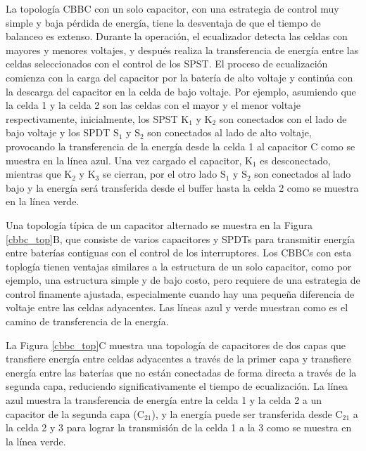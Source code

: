 \documentclass[10pt,a4paper]{article}
\begin{document}
La topolog\'ia \acrshort{CBBC} con un solo capacitor, con una estrategia de
control muy simple y baja p\'erdida de energ\'ia, tiene la desventaja de que el
tiempo de balanceo es extenso. Durante la operaci\'on, el ecualizador detecta
las celdas con mayores y menores voltajes, y despu\'es realiza la transferencia
de energ\'ia entre las celdas seleccionados con el control de los
\acrshort{SPST}. El proceso de ecualizaci\'on comienza con la carga del
capacitor por la bater\'ia de alto voltaje y contin\'ua con la descarga del
capacitor en la celda de bajo voltaje. Por ejemplo, asumiendo que la celda 1 y
la celda 2 son las celdas con el mayor y el menor voltaje respectivamente,
inicialmente, los \acrshort{SPST} $\mathrm{K_1}$ y $\mathrm{K_2}$ son conectados
con el lado de bajo voltaje y los \acrshort{SPDT} $\mathrm{S_1}$ y 
$\mathrm{S_2}$ son conectados al lado de alto voltaje, provocando la
transferencia de la energ\'ia desde la celda 1 al capacitor C como se muestra en
la línea azul. Una vez cargado el capacitor, $\mathrm{K_1}$ es desconectado,
mientras que $\mathrm{K_2}$ y $\mathrm{K_3}$ se cierran, por el otro lado
$\mathrm{S_1}$ y $\mathrm{S_2}$ son conectados al lado bajo y la energ\'ia
ser\'a transferida desde el buffer hasta la celda 2 como se muestra en la línea
verde.

Una topolog\'ia t\'ipica de un capacitor alternado se muestra en la Figura
\ref{cbbc_top}B, que consiste de varios capacitores y \acrshort{SPDT}s para
transmitir energ\'ia entre bater\'ias contiguas con el control de los
interruptores. Los \acrshort{CBBC}s con esta toplog\'ia tienen ventajas 
similares a la estructura de un solo capacitor, como por ejemplo, una estructura 
simple y de bajo costo, pero requiere de una estrategia de control finamente 
ajustada, especialmente cuando hay una pequeña diferencia de voltaje entre las 
celdas adyacentes. Las líneas azul y verde muestran como es el camino de 
transferencia de la energ\'ia.

La Figura \ref{cbbc_top}C muestra una topolog\'ia de capacitores de dos capas
que transfiere energ\'ia entre celdas adyacentes a trav\'es de la primer capa y
transfiere energ\'ia entre las bater\'ias que no est\'an conectadas de forma
directa a trav\'es de la segunda capa, reduciendo significativamente el tiempo
de ecualizaci\'on. La línea azul muestra la transferencia de energ\'ia entre la
celda 1 y la celda 2 a un capacitor de la segunda capa ($\mathrm{C_{21}}$), y la
energ\'ia puede ser transferida desde $\mathrm{C_{21}}$ a la celda 2 y 3 para
lograr la transmisi\'on de la celda 1 a la 3 como se muestra en la línea verde. 
\end{document}
